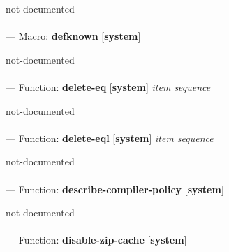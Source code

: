 \begin{adjustwidth}{5em}{5em}
not-documented
\end{adjustwidth}

\paragraph{}
\label{SYSTEM:DEFKNOWN}
--- Macro: \textbf{defknown} [\textbf{system}] \textit{}

\begin{adjustwidth}{5em}{5em}
not-documented
\end{adjustwidth}

\paragraph{}
\label{SYSTEM:DELETE-EQ}
--- Function: \textbf{delete-eq} [\textbf{system}] \textit{item sequence}

\begin{adjustwidth}{5em}{5em}
not-documented
\end{adjustwidth}

\paragraph{}
\label{SYSTEM:DELETE-EQL}
--- Function: \textbf{delete-eql} [\textbf{system}] \textit{item sequence}

\begin{adjustwidth}{5em}{5em}
not-documented
\end{adjustwidth}

\paragraph{}
\label{SYSTEM:DESCRIBE-COMPILER-POLICY}
--- Function: \textbf{describe-compiler-policy} [\textbf{system}] \textit{}

\begin{adjustwidth}{5em}{5em}
not-documented
\end{adjustwidth}

\paragraph{}
\label{SYSTEM:DISABLE-ZIP-CACHE}
--- Function: \textbf{disable-zip-cache} [\textbf{system}] \textit{}

